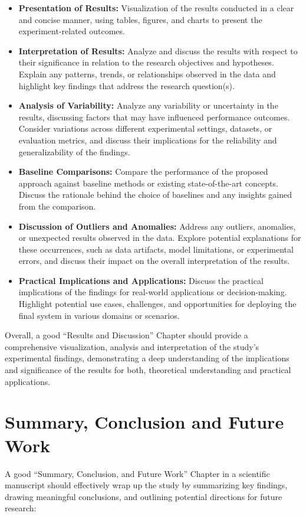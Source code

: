 \documentclass{article}
\begin{document}
\begin{itemize}
\item \textbf{Presentation of Results:} Visualization of the results conducted in a clear and concise manner, using tables, figures, and charts to present the experiment-related outcomes.
\item \textbf{Interpretation of Results:} Analyze and discuss the results with respect to their significance in relation to the research objectives and hypotheses. Explain any patterns, trends, or relationships observed in the data and highlight key findings that address the research question(s).
\item \textbf{Analysis of Variability:} Analyze any variability or uncertainty in the results, discussing factors that may have influenced performance outcomes. Consider variations across different experimental settings, datasets, or evaluation metrics, and discuss their implications for the reliability and generalizability of the findings.
\item \textbf{Baseline Comparisons:} Compare the performance of the proposed approach against baseline methods or existing state-of-the-art concepts. Discuss the rationale behind the choice of baselines and any insights gained from the comparison.
\item \textbf{Discussion of Outliers and Anomalies:} Address any outliers, anomalies, or unexpected results observed in the data. Explore potential explanations for these occurrences, such as data artifacts, model limitations, or experimental errors, and discuss their impact on the overall interpretation of the results.
\item \textbf{Practical Implications and Applications:} Discuss the practical implications of the findings for real-world applications or decision-making. Highlight potential use cases, challenges, and opportunities for deploying the final system in various domains or scenarios.
\end{itemize}

Overall, a good ``Results and Discussion'' Chapter should provide a comprehensive visualization, analysis and interpretation of the study's experimental findings, demonstrating a deep understanding of the implications and significance of the results for both, theoretical understanding and practical applications.

\section{Summary, Conclusion and Future Work}
A good ``Summary, Conclusion, and Future Work'' Chapter in a scientific manuscript should effectively wrap up the study by summarizing key findings, drawing meaningful conclusions, and outlining potential directions for future research:
\end{document}
